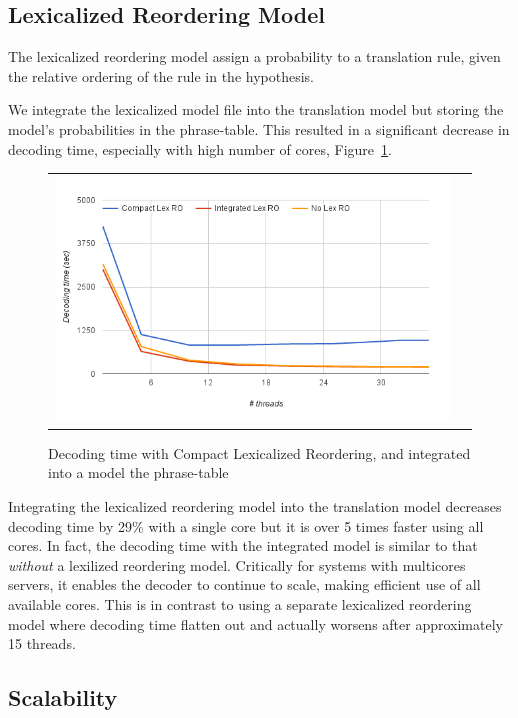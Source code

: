 \documentclass[11pt]{article}
\begin{document}
\subsection{Lexicalized Reordering Model}

The lexicalized reordering model assign a probability to a translation rule, given the relative ordering of the rule in the hypothesis. 

We integrate the lexicalized model file into the translation model but storing the model's probabilities in the phrase-table. This resulted in a significant decrease in decoding time, especially with high number of cores, Figure~\ref{fig:lex-ro}. 
\begin{figure}[h]
\centering
\begin{tabular}{cc}
{\includegraphics[scale=0.4]{lex-ro.png}} 
\end{tabular}
\caption{Decoding time with Compact Lexicalized Reordering, and integrated into a model the phrase-table}
\label{fig:lex-ro}
\end{figure} 
Integrating the lexicalized reordering model into the translation model decreases decoding time by 29\% with a single core but it is over 5 times faster using all cores. In fact, the decoding time with the integrated model is similar to that \emph{without} a lexilized reordering model. Critically for systems with multicores servers, it enables the decoder to continue to scale, making efficient use of all available cores. This is in contrast to using a separate lexicalized reordering model where decoding time flatten out and actually worsens after approximately 15 threads.

\subsection{Scalability}
\end{document}
